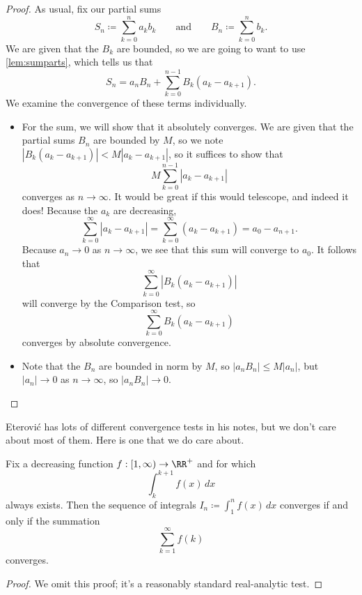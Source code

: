 \documentclass[../notes.tex]{subfiles}
\begin{document}
\begin{proof}
	As usual, fix our partial sums
	\[S_n\coloneqq \sum_{k=0}^na_kb_k\qquad\text{and}\qquad B_n\coloneqq \sum_{k=0}^nb_k.\]
	We are given that the $B_k$ are bounded, so we are going to want to use \autoref{lem:sumparts}, which tells us that
	\[S_n=a_nB_n+\sum_{k=0}^{n-1}B_k(a_k-a_{k+1}).\]
	We examine the convergence of these terms individually.
	\begin{itemize}
		\item For the sum, we will show that it absolutely converges. We are given that the partial sums $B_n$ are bounded by $M$, so we note $|B_k(a_k-a_{k+1})|<M|a_k-a_{k+1}|$, so it suffices to show that
		\[M\sum_{k=0}^{n-1}\left|a_k-a_{k+1}\right|\]
		converges as $n\to\infty$. It would be great if this would telescope, and indeed it does! Because the $a_k$ are decreasing,
		\[\sum_{k=0}^\infty|a_k-a_{k+1}|=\sum_{k=0}^\infty(a_k-a_{k+1})=a_0-a_{n+1}.\]
		Because $a_n\to0$ as $n\to\infty$, we see that this sum will converge to $a_0$. It follows that
		\[\sum_{k=0}^\infty|B_k(a_k-a_{k+1})|\]
		will converge by the Comparison test, so
		\[\sum_{k=0}^\infty B_k(a_k-a_{k+1})\]
		converges by absolute convergence.
		\item Note that the $B_n$ are bounded in norm by $M$, so $|a_nB_n|\le M|a_n|$, but $|a_n|\to0$ as $n\to\infty$, so $|a_nB_n|\to0$.
		\qedhere
	\end{itemize}
\end{proof}
Eterovi\'c has lots of different convergence tests in his notes, but we don't care about most of them. Here is one that we do care about.
\begin{theorem}
	Fix a decreasing function $f:\left[1,\infty\right)\to\RR^+$ and for which
	\[\int_k^{k+1}f(x)\,dx\]
	always exists. Then the sequence of integrals $I_n\coloneqq \int_1^nf(x)\,dx$ converges if and only if the summation
	\[\sum_{k=1}^\infty f(k)\]
	converges.
\end{theorem}
\begin{proof}
	We omit this proof; it's a reasonably standard real-analytic test.
\end{proof}
\end{document}
